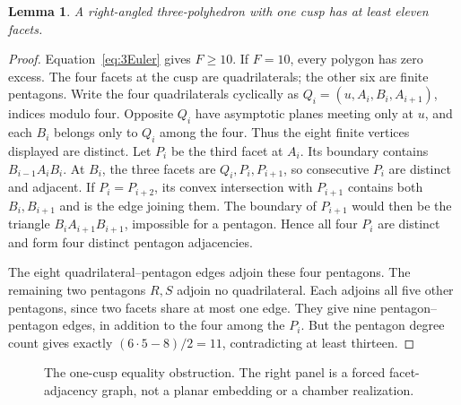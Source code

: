 \documentclass[11pt]{article}
\newtheorem{lemma}[theorem]{Lemma}
\begin{document}
\begin{lemma}\label{lem:one-cusp}
A right-angled three-polyhedron with one cusp has at least eleven facets.
\end{lemma}
\begin{proof}
Equation~\eqref{eq:3Euler} gives $F\ge10$. If $F=10$, every polygon
has zero excess. The four facets at the cusp are quadrilaterals;
the other six are finite pentagons. Write the four quadrilaterals
cyclically as $Q_i=(u,A_i,B_i,A_{i+1})$, indices modulo four.
Opposite $Q_i$ have asymptotic planes meeting only at $u$, and each
$B_i$ belongs only to $Q_i$ among the four. Thus the eight finite
vertices displayed are distinct.
Let $P_i$ be the third facet at $A_i$. Its boundary contains
$B_{i-1}A_iB_i$. At $B_i$, the three facets are
$Q_i,P_i,P_{i+1}$, so consecutive $P_i$ are distinct and adjacent.
If $P_i=P_{i+2}$, its convex intersection with $P_{i+1}$ contains
both $B_i,B_{i+1}$ and is the edge joining them. The boundary of
$P_{i+1}$ would then be the triangle
$B_iA_{i+1}B_{i+1}$, impossible for a pentagon. Hence all four
$P_i$ are distinct and form four distinct pentagon adjacencies.

The eight quadrilateral--pentagon edges adjoin these four pentagons.
The remaining two pentagons $R,S$ adjoin no quadrilateral. Each
adjoins all five other pentagons, since two facets share at most one
edge. They give nine pentagon--pentagon edges, in addition to the
four among the $P_i$. But the pentagon degree count gives exactly
$(6\cdot5-8)/2=11$, contradicting at least thirteen.
\end{proof}

\begin{figure}[ht]
\centering
{}
\caption{The one-cusp equality obstruction. The right panel is a forced
facet-adjacency graph, not a planar embedding or a chamber realization.}
\label{fig:one-cusp}
\end{figure}
\end{document}
